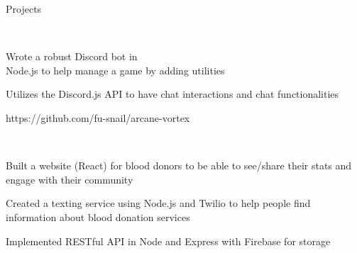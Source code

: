 \documentclass[]{deedy-resume-openfont}
\begin{document}
%
%

\begin{flushleft} \huge{Projects} \end{flushleft}


\begin{minipage}[t]{0.495\textwidth} 

 \\
\begin{tightemize}
\item Wrote a robust Discord bot in \\ Node.js to help manage a game by adding utilities
\item Utilizes the Discord.js API to have chat interactions and chat functionalities
\item https://github.com/fu-snail/arcane-vortex
\end{tightemize}
\sectionsep

\end{minipage} 
\hfill
\begin{minipage}[t]{0.495\textwidth} 


 \\
\begin{tightemize}
\item Built a website (React) for blood donors to be able to see/share their stats and engage with their community
\item Created a texting service using Node.js and Twilio to help people find information about blood donation services
\item Implemented RESTful API in Node and Express with Firebase for storage
\end{tightemize}
\sectionsep

\end{minipage}
\hfill

\end{document}
